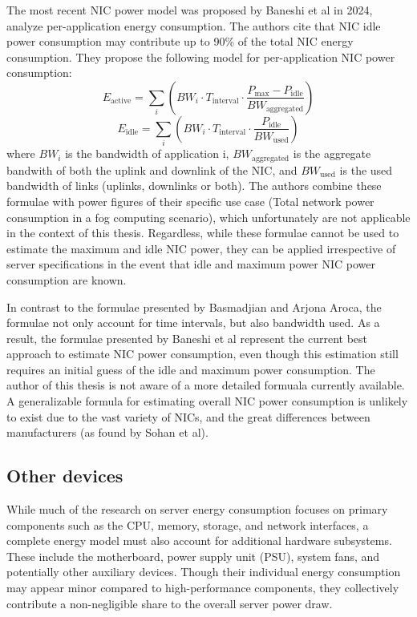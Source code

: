The most recent NIC power model was proposed by Baneshi et al\parencite{baneshiAnalyzingPerApplicationEnergy2024} in 2024, analyze per-application energy consumption. The authors cite that NIC idle power consumption may contribute up to 90\% of the total NIC energy consumption. They propose the following model for per-application NIC power consumption:
\begin{equation}
    E_{\text{active}} = \sum_{i} \left( BW_i \cdot T_{\text{interval}} \cdot \frac{P_{\text{max}} - P_{\text{idle}}}{BW_{\text{aggregated}}} \right)
\end{equation}
\begin{equation}
    E_{\text{idle}} = \sum_{i} \left( BW_i \cdot T_{\text{interval}} \cdot \frac{P_{\text{idle}}}{BW_{\text{used}}} \right)
\end{equation}
where $BW_i$ is the bandwidth of application i, $BW_{\text{aggregated}}$ is the aggregate bandwith of both the uplink and downlink of the NIC, and $BW_{\text{used}}$ is the used bandwidth of links (uplinks, downlinks or both). The authors combine these formulae with power figures of their specific use case (Total network power consumption in a fog computing scenario), which unfortunately are not applicable in the context of this thesis. Regardless, while these formulae cannot be used to estimate the maximum and idle NIC power, they can be applied irrespective of server specifications in the event that idle and maximum power NIC power consumption are known.

In contrast to the formulae presented by Basmadjian and Arjona Aroca, the formulae not only account for time intervals, but also bandwidth used. As a result, the formulae presented by Baneshi et al represent the current best approach to estimate NIC power consumption, even though this estimation still requires an initial guess of the idle and maximum power consumption. The author of this thesis is not aware of a more detailed formuala currently available. A generalizable formula for estimating overall NIC power consumption is unlikely to exist due to the vast variety of NICs, and the great differences between manufacturers (as found by Sohan et al). 

\subsection{Other devices}
While much of the research on server energy consumption focuses on primary components such as the CPU, memory, storage, and network interfaces, a complete energy model must also account for additional hardware subsystems. These include the motherboard, power supply unit (PSU), system fans, and potentially other auxiliary devices. Though their individual energy consumption may appear minor compared to high-performance components, they collectively contribute a non-negligible share to the overall server power draw.

